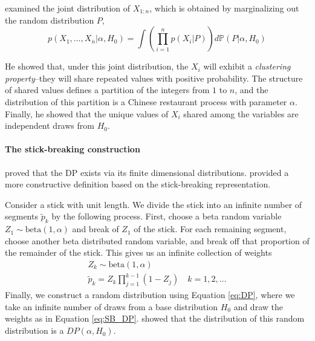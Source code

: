 \cite{ferguson73} examined the joint distribution of $X_{1:n}$, which is obtained by marginalizing out the random distribution $P$,
\begin{equation}
p(X_1,\dots,X_n|\alpha,H_0) = \int{\left(\prod_{i=1}^n p(X_i|P) \right) d \mathbb{P}(P|\alpha,H_0)}
\end{equation}

He showed that, under this joint distribution, the $X_i$ will exhibit a \textit{clustering property}--they will share repeated values with positive probability. The structure of shared values defines a partition of the integers from $1$ to $n$, and the distribution of this partition is a Chinese restaurant process with parameter $\alpha$. Finally, he showed that the unique values of $X_i$ shared among the variables are independent draws from $H_0$.

\paragraph{The stick-breaking construction}
\cite{ferguson73} proved that the \gls{DP} exists via its finite dimensional distributions. \cite{sethuraman94} provided a more constructive definition based on the stick-breaking representation.

Consider a stick with unit length. We divide the stick into an infinite number of segments $\tilde{p}_k$ by the following process. First, choose a beta random variable $Z_1 \sim \text{beta}(1, \alpha)$ and break of $Z_1$ of the stick. For each remaining segment, choose another beta distributed random variable, and break off that proportion of the remainder of the stick. This gives us an infinite collection of weights 
\begin{gather}
Z_k \sim \text{beta}(1, \alpha) \\
\tilde{p}_k = Z_k \prod_{j=1}^{k-1}(1-Z_j) \quad k= 1,2,\dots \label{eq:SB_DP}
\end{gather}
Finally, we construct a random distribution using Equation \ref{eq:DP}, where we take an infinite number of draws from a base distribution $H_0$ and draw the weights as in Equation \ref{eq:SB_DP}. \cite{sethuraman94} showed that the distribution of this random distribution is a $DP(\alpha,H_0)$.

